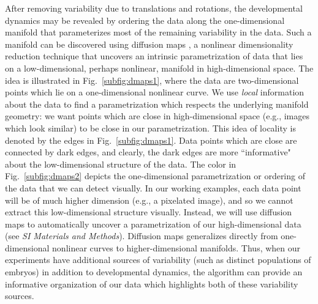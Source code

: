 \documentclass{pnastwo}
\newcommand{\SI}[0]{{\it SI Materials and Methods}}
\newcommand{\fig}[0]{Fig.}
\begin{document}
\begin{article}
%
After removing variability due to translations and rotations, the developmental dynamics may be revealed by ordering the data along the one-dimensional manifold that parameterizes most of the remaining variability in the data.
%
Such a manifold can be discovered using diffusion maps \cite{coifman2005geometric}, a nonlinear dimensionality reduction technique that uncovers an intrinsic parametrization of data that lies on a low-dimensional, perhaps nonlinear, manifold in high-dimensional space.
%
The idea is illustrated in \fig~\ref{subfig:dmaps1}, where the data are two-dimensional points which lie on a one-dimensional nonlinear curve.
%
We use {\it local} information about the data to find a parametrization  which respects the underlying manifold geometry: we want points which are close in high-dimensional space (e.g., images which look similar) to be close in our parametrization.
%
This idea of locality is denoted by the edges in \fig~\ref{subfig:dmaps1}.
%
Data points which are close are connected by dark edges, and clearly, the dark edges are more ``informative" about the low-dimensional structure of the data.
%
The color in \fig~\ref{subfig:dmaps2} depicts the one-dimensional parametrization or ordering of the data that we can detect visually.
%
In our working examples, each data point will be of much higher dimension (e.g., a pixelated image), and so we cannot extract this low-dimensional structure visually.
%
Instead, we will use diffusion maps to automatically uncover a parametrization of our high-dimensional data (see \SI).
%
Diffusion maps generalizes directly from one-dimensional nonlinear curves to higher-dimensional manifolds.
%
Thus, when our experiments have additional sources of variability (such as distinct populations of embryos) in addition to developmental dynamics, the algorithm can provide an informative organization of our data which highlights both of these variability sources.


\end{article}
\end{document}
